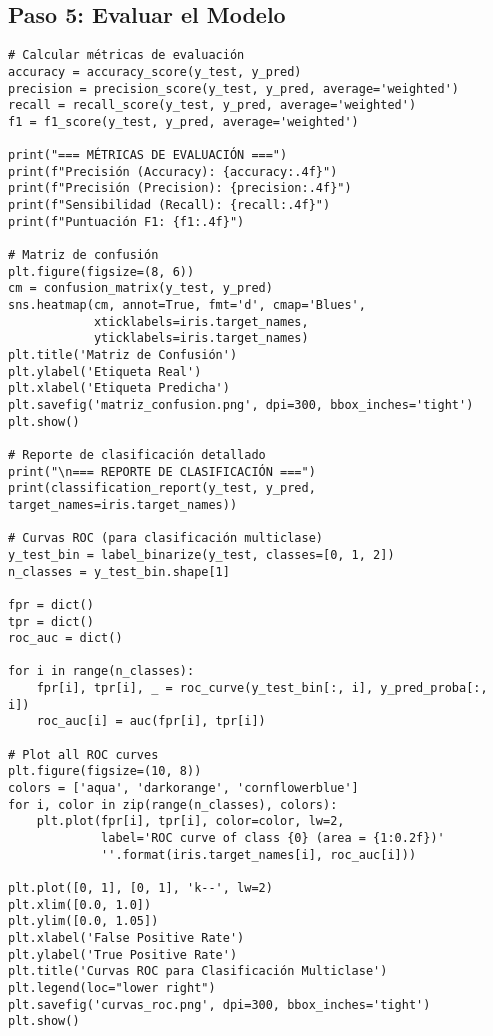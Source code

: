 \documentclass[12pt]{article}
\begin{document}
\subsection{Paso 5: Evaluar el Modelo}
\begin{lstlisting}
# Calcular métricas de evaluación
accuracy = accuracy_score(y_test, y_pred)
precision = precision_score(y_test, y_pred, average='weighted')
recall = recall_score(y_test, y_pred, average='weighted')
f1 = f1_score(y_test, y_pred, average='weighted')

print("=== MÉTRICAS DE EVALUACIÓN ===")
print(f"Precisión (Accuracy): {accuracy:.4f}")
print(f"Precisión (Precision): {precision:.4f}")
print(f"Sensibilidad (Recall): {recall:.4f}")
print(f"Puntuación F1: {f1:.4f}")

# Matriz de confusión
plt.figure(figsize=(8, 6))
cm = confusion_matrix(y_test, y_pred)
sns.heatmap(cm, annot=True, fmt='d', cmap='Blues', 
            xticklabels=iris.target_names, 
            yticklabels=iris.target_names)
plt.title('Matriz de Confusión')
plt.ylabel('Etiqueta Real')
plt.xlabel('Etiqueta Predicha')
plt.savefig('matriz_confusion.png', dpi=300, bbox_inches='tight')
plt.show()

# Reporte de clasificación detallado
print("\n=== REPORTE DE CLASIFICACIÓN ===")
print(classification_report(y_test, y_pred, target_names=iris.target_names))

# Curvas ROC (para clasificación multiclase)
y_test_bin = label_binarize(y_test, classes=[0, 1, 2])
n_classes = y_test_bin.shape[1]

fpr = dict()
tpr = dict()
roc_auc = dict()

for i in range(n_classes):
    fpr[i], tpr[i], _ = roc_curve(y_test_bin[:, i], y_pred_proba[:, i])
    roc_auc[i] = auc(fpr[i], tpr[i])

# Plot all ROC curves
plt.figure(figsize=(10, 8))
colors = ['aqua', 'darkorange', 'cornflowerblue']
for i, color in zip(range(n_classes), colors):
    plt.plot(fpr[i], tpr[i], color=color, lw=2,
             label='ROC curve of class {0} (area = {1:0.2f})'
             ''.format(iris.target_names[i], roc_auc[i]))

plt.plot([0, 1], [0, 1], 'k--', lw=2)
plt.xlim([0.0, 1.0])
plt.ylim([0.0, 1.05])
plt.xlabel('False Positive Rate')
plt.ylabel('True Positive Rate')
plt.title('Curvas ROC para Clasificación Multiclase')
plt.legend(loc="lower right")
plt.savefig('curvas_roc.png', dpi=300, bbox_inches='tight')
plt.show()
\end{lstlisting}
\end{document}
